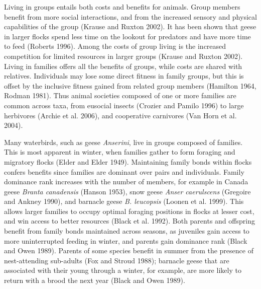 \documentclass[10pt,twocolumn]{paper}
\begin{document}
Living in groups entails both costs and benefits for animals. Group
members benefit from more social interactions, and from the increased
sensory and physical capabilities of the group (Krause and Ruxton 2002).
It has been shown that geese in larger flocks spend less time on the
lookout for predators and have more time to feed (Roberts 1996). Among
the costs of group living is the increased competition for limited
resources in larger groups (Krause and Ruxton 2002). Living in families
offers all the benefits of groups, while costs are shared with
relatives. Individuals may lose some direct fitness in family groups,
but this is offset by the inclusive fitness gained from related group
members (Hamilton 1964, Rodman 1981). Thus animal societies composed of
one or more families are common across taxa, from eusocial insects
(Crozier and Pamilo 1996) to large herbivores (Archie et al. 2006), and
cooperative carnivores (Van Horn et al. 2004).

Many waterbirds, such as geese \emph{Anserini}, live in groups composed
of families. This is most apparent in winter, when families gather to
form foraging and migratory flocks (Elder and Elder 1949). Maintaining
family bonds within flocks confers benefits since families are dominant
over pairs and individuals. Family dominance rank increases with the
number of members, for example in Canada geese \emph{Branta canadensis}
(Hanson 1953), snow geese \emph{Anser caerulscens} (Gregoire and Ankney
1990), and barnacle geese \emph{B. leucopsis} (Loonen et al. 1999). This
allows larger families to occupy optimal foraging positions in flocks at
lesser cost, and win access to better resources (Black et al. 1992).
Both parents and offspring benefit from family bonds maintained across
seasons, as juveniles gain access to more uninterrupted feeding in
winter, and parents gain dominance rank (Black and Owen 1989). Parents
of some species benefit in summer from the presence of nest-attending
sub-adults (Fox and Stroud 1988); barnacle geese that are associated
with their young through a winter, for example, are more likely to
return with a brood the next year (Black and Owen 1989).
\end{document}
